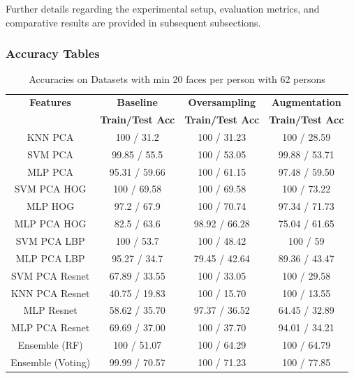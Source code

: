 \documentclass[a4paper]{article}
\theoremstyle{plain}
\theoremstyle{definition}
\begin{document}
Further details regarding the experimental setup, evaluation metrics, and comparative results are provided in subsequent subsections.

\subsubsection{Accuracy Tables}

\begin{table}[htbp]
    \centering
    \begin{tabular}{|c|c|c|c|}
    \hline
    \textbf{Features} & \textbf{Baseline} & \textbf{Oversampling} & \textbf{Augmentation}\\
    \textbf{} & \textbf{Train/Test Acc} & \textbf{Train/Test Acc} & \textbf{Train/Test Acc }\\
    \hline
    KNN PCA & 100 / 31.2 & 100 / 31.23 & 100 / 28.59 \\
    \hline
    SVM PCA & 99.85 / 55.5 & 100 / 53.05 & 99.88 / 53.71 \\
    \hline
    MLP PCA & 95.31 / 59.66 & 100 / 61.15 & 97.48 / 59.50 \\
    \hline
    SVM PCA HOG  & 100 / 69.58 & 100 / 69.58 & 100 / 73.22 \\
    \hline
    MLP HOG & 97.2 / 67.9 & 100 / 70.74 & 97.34 / 71.73 \\
    \hline
    MLP PCA HOG & 82.5 / 63.6 & 98.92 / 66.28 & 75.04 / 61.65 \\
    \hline
    SVM PCA LBP & 100 / 53.7 & 100 / 48.42 & 100 / 59 \\
    \hline
    MLP PCA LBP & 95.27 / 34.7 & 79.45 / 42.64 & 89.36 / 43.47 \\
    \hline
    SVM PCA Resnet & 67.89 / 33.55 & 100 / 33.05 & 100 / 29.58 \\
    \hline
    KNN PCA Resnet & 40.75 / 19.83 & 100 / 15.70 & 100 / 13.55 \\
    \hline
    MLP Resnet & 58.62 / 35.70  & 97.37 / 36.52 & 64.45 / 32.89  \\
    \hline
    MLP PCA Resnet & 69.69 / 37.00  & 100 / 37.70 & 94.01 / 34.21 \\
    \hline
    Ensemble (RF) & 100 / 51.07 & 100 / 64.29 & 100 / 64.79 \\
    \hline
    Ensemble (Voting) & 99.99 / 70.57 & 100 / 71.23 & 100 / 77.85 \\
    \hline
    \end{tabular}
    \caption{Accuracies on Datasets with min 20 faces per person with 62 persons}
    \label{tab:accuracy1}
\end{table}
\end{document}
